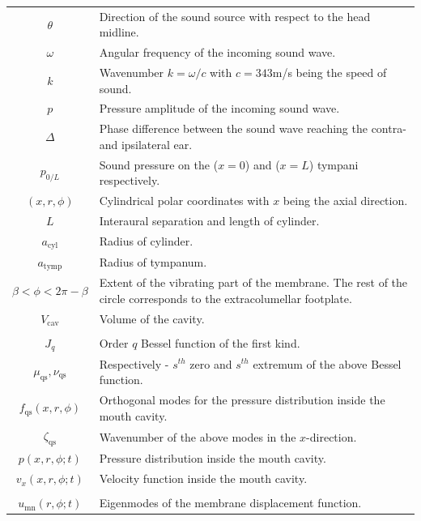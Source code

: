 \noindent
\begin{minipage}{\linewidth}
\renewcommand{\arraystretch}{1.1}
\centering
{} \label{parametertable} 
\begin{tabular}{c p{12 cm}}
\hline
$\theta$ & Direction of the sound source with respect to the head midline.\\
$\omega$ & Angular frequency of the incoming sound wave.\\
$k$ & Wavenumber $k=\omega/c$ with $c=343$m/s being the speed of sound.\\
$p$ & Pressure amplitude of the incoming sound wave.\\
$\Delta$ & Phase difference between the sound wave reaching the contra- and ipsilateral ear.\\
$p_{0/L}$ & Sound pressure on the ($x=0$) and ($x=L$) tympani respectively.\\
$(x,r,\phi)$ & Cylindrical polar coordinates with $x$ being the axial direction.\\
$L$ & Interaural separation and length of cylinder.\\
$a_{\mathrm{cyl}}$ & Radius of cylinder.\\
$a_{\mathrm{tymp}}$ & Radius of tympanum.\\
$\beta<\phi<2\pi-\beta$ & Extent of the vibrating part of the membrane. The rest of the circle corresponds to
the extracolumellar footplate.\\
$V_{\mathrm{cav}}$ & Volume of the cavity.\\
&\\
$J_q$ & Order $q$ Bessel function of the first kind.\\
$\mu_{\mathrm{qs}},\nu_{\mathrm{qs}}$ & Respectively - $s^{th}$ zero and $s^{th}$ extremum of the above Bessel function.\\
$f_{\mathrm{qs}}(x,r,\phi)$ & Orthogonal modes for the pressure distribution inside the mouth cavity.\\
$\zeta_{\mathrm{qs}}$ & Wavenumber of the above modes in the $x$-direction.\\
$p(x,r,\phi;t)$ & Pressure distribution inside the mouth cavity.\\
$v_x(x,r,\phi;t)$ & Velocity function inside the mouth cavity.\\
&\\
$u_{\mathrm{mn}}(r,\phi;t)$ & Eigenmodes of the membrane displacement function.\\

\end{tabular}
\end{minipage}
